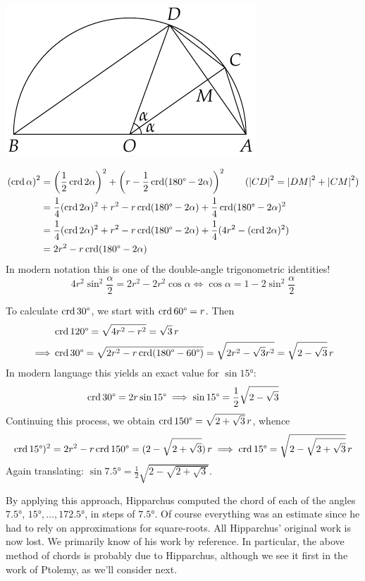 \hfill
\begin{minipage}[t]{0.39\linewidth}\vspace{0pt}
	\flushright\includegraphics[scale=0.95]{trig-double}
\end{minipage}
\begin{align*}
	\left(\crd\alpha\right)^2&=\left(\frac 12\crd 2\alpha\right)^2+\left(r-\frac 12\crd(\ang{180}-2\alpha)\right)^2 \tag{$\nm{CD}^2=\nm{DM}^2+\nm{CM}^2$}\\
	&=\frac 14(\crd 2\alpha)^2+r^2-r\crd(\ang{180}-2\alpha)+\frac 14\crd(\ang{180}-2\alpha)^2\\
	&=\frac 14(\crd 2\alpha)^2+r^2-r\crd(\ang{180}-2\alpha)+\frac 14(4r^2-(\crd 2\alpha)^2)\\
	&=2r^2-r\crd(\ang{180}-2\alpha)
\end{align*}
In modern notation this is one of the double-angle trigonometric identities!
\[
	4r^2\sin^2\frac\alpha 2 =2r^2-2r^2\cos\alpha\iff \cos\alpha=1-2\sin^2\frac\alpha 2
\]
\goodbreak


 To calculate $\crd \ang{30}$, we start with $\crd\ang{60}=r$. Then
\begin{align*}
	&\crd\ang{120}=\sqrt{4r^2-r^2}=\sqrt 3\,r\\
	\implies &\crd\ang{30}=\sqrt{2r^2-r\crd(\ang{180}-\ang{60})}=\sqrt{2r^2-\sqrt 3r^2}=\sqrt{2-\sqrt 3}\,r
\end{align*}
In modern language this yields an exact value for $\sin\ang{15}$:
\[
	\crd\ang{30}=2r\sin\ang{15}\implies\sin\ang{15} =\frac 12\sqrt{2-\sqrt 3}
\]
Continuing this process, we obtain $\crd \ang{150}=\sqrt{2+\sqrt 3}\,r$, whence
\[
	\crd\ang{15})^2=2r^2-r\crd\ang{150}=(2-\sqrt{2+\sqrt 3})\,r\implies \crd\ang{15}=\sqrt{2-\sqrt{2+\sqrt 3}}\,r
\]
Again translating: $\sin\ang{7.5}=\frac 12\sqrt{2-\sqrt{2+\sqrt 3}}$.\smallbreak

By applying this approach, Hipparchus computed the chord of each of the angles $\ang{7.5}$, $\ang{15},\ldots,\ang{172.5}$, in steps of $\ang{7.5}$. Of course everything was an estimate since he had to rely on approximations for square-roots. All Hipparchus' original work is now lost. We primarily know of his work by reference. In particular, the above method of chords is probably due to Hipparchus, although we see it first in the work of Ptolemy, as we'll consider next.




